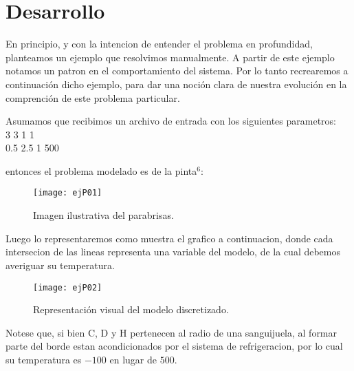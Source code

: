 \section{Desarrollo}

En principio, y con la intencion de entender el problema en profundidad, planteamos un ejemplo que resolvimos manualmente. A partir de este ejemplo
notamos un patron en el comportamiento del sistema. Por lo tanto recrearemos a continuaci\'on dicho ejemplo, para dar una noci\'on clara de nuestra 
evoluci\'on en la comprenci\'on de este problema particular.

Asumamos que recibimos un archivo de entrada con los siguientes parametros:\\
3 3 1 1\\
0.5 2.5 1 500

entonces el problema modelado es de la pinta$^6$:

\begin{figure}[H]
    \texttt{[image: ejP01]}
    \caption{Imagen ilustrativa del parabrisas.}
\end{figure}
Luego lo representaremos como muestra el grafico a continuacion, donde cada intersecion de las lineas representa una variable del modelo, de la cual
debemos averiguar su temperatura.
\begin{figure}[H]
    \texttt{[image: ejP02]}
    \caption{Representaci\'on visual del modelo discretizado.}
\end{figure}

Notese que, si bien C, D y H pertenecen al radio de una sanguijuela, al formar parte del borde estan acondicionados por el sistema de refrigeracion,
por lo cual su temperatura es $-100$ en lugar de $500$.


